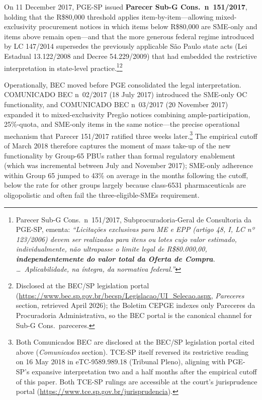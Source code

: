 On 11 December 2017, PGE-SP issued \textbf{Parecer Sub-G Cons.\ n\textordmasculine~151/2017}, holding that the R\$80{,}000 threshold applies item-by-item---allowing mixed-exclusivity procurement notices in which items below R\$80{,}000 are SME-only and items above remain open---and that the more generous federal regime introduced by LC 147/2014 supersedes the previously applicable São Paulo state acts (Lei Estadual 13.122/2008 and Decree 54.229/2009) that had embedded the restrictive interpretation in state-level practice.\footnote{Parecer Sub-G Cons.\ n\textordmasculine~151/2017, Subprocuradoria-Geral de Consultoria da PGE-SP, ementa: \emph{``Licitações exclusivas para ME e EPP (artigo 48, I, LC nº 123/2006) devem ser realizadas para itens ou lotes cujo valor estimado, individualmente, não ultrapasse o limite legal de R\$80.000,00, \textbf{independentemente do valor total da Oferta de Compra}. \ldots\ Aplicabilidade, na íntegra, da normativa federal.''}}\footnote{Disclosed at the BEC/SP legislation portal (\url{https://www.bec.sp.gov.br/becsp/Legislacao/UI_Selecao.aspx}, \emph{Pareceres} section, retrieved April 2026); the Boletim CEPGE indexes only Pareceres da Procuradoria Administrativa, so the BEC portal is the canonical channel for Sub-G Cons.\ pareceres.}

Operationally, BEC moved before PGE consolidated the legal interpretation. COMUNICADO BEC n\textordmasculine~02/2017 (18 July 2017) introduced the SME-only OC functionality, and COMUNICADO BEC n\textordmasculine~03/2017 (20 November 2017) expanded it to mixed-exclusivity Pregão notices combining ample-participation, 25\%-quota, and SME-only items in the same notice---the precise operational mechanism that Parecer 151/2017 ratified three weeks later.\footnote{Both Comunicados BEC are disclosed at the BEC/SP legislation portal cited above (\emph{Comunicados} section). TCE-SP itself reversed its restrictive reading on 16 May 2018 in eTC-9589.989.18 (Tribunal Pleno), aligning with PGE-SP's expansive interpretation two and a half months after the empirical cutoff of this paper. Both TCE-SP rulings are accessible at the court's jurisprudence portal (\url{https://www.tce.sp.gov.br/jurisprudencia}).} The empirical cutoff of March 2018 therefore captures the moment of mass take-up of the new functionality by Group-65 PBUs rather than formal regulatory enablement (which was incremental between July and November 2017); SME-only adherence within Group 65 jumped to 43\% on average in the months following the cutoff, below the rate for other groups largely because class-6531 pharmaceuticals are oligopolistic and often fail the three-eligible-SMEs requirement.

